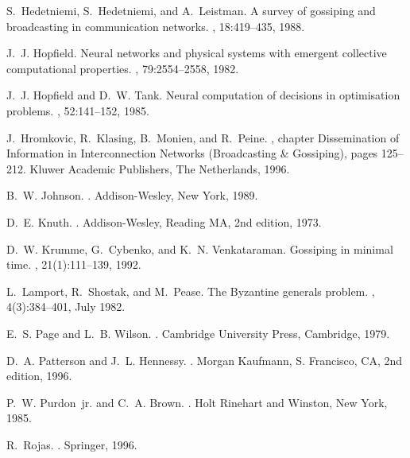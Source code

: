 \documentclass{elsart}
\begin{document}
\begin{thebibliography}{10}
S.~Hedetniemi, S.~Hedetniemi, and A.~Leistman.
\newblock A survey of gossiping and broadcasting in communication networks.
, 18:419--435, 1988.

J.~J. Hopfield.
\newblock Neural networks and physical systems with emergent collective
  computational properties.
, 79:2554--2558, 1982.

J.~J. Hopfield and D.~W. Tank.
\newblock Neural computation of decisions in optimisation problems.
, 52:141--152, 1985.

J.~Hromkovic, R.~Klasing, B.~Monien, and R.~Peine.
, chapter Dissemination of
  Information in Interconnection Networks (Broadcasting \& Gossiping), pages
  125--212.
\newblock Kluwer Academic Publishers, The Netherlands, 1996.

B.~W. Johnson.
.
\newblock Addison-Wesley, New York, 1989.

D.~E. Knuth.
.
\newblock Addison-Wesley, Reading MA, 2nd edition, 1973.

D.~W. Krumme, G.~Cybenko, and K.~N. Venkataraman.
\newblock Gossiping in minimal time.
, 21(1):111--139, 1992.

L.~Lamport, R.~Shostak, and M.~Pease.
\newblock The {B}yzantine generals problem.
, 4(3):384--401,
  July 1982.

E.~S. Page and L.~B. Wilson.
.
\newblock Cambridge University Press, Cambridge, 1979.

D.~A. Patterson and J.~L. Hennessy.
.
\newblock Morgan Kaufmann, S. Francisco, CA, 2nd edition, 1996.

P.~W. Purdon~jr. and C.~A. Brown.
.
\newblock Holt Rinehart and Winston, New York, 1985.

R.~Rojas.
.
\newblock Springer, 1996.


\end{thebibliography}
\end{document}
